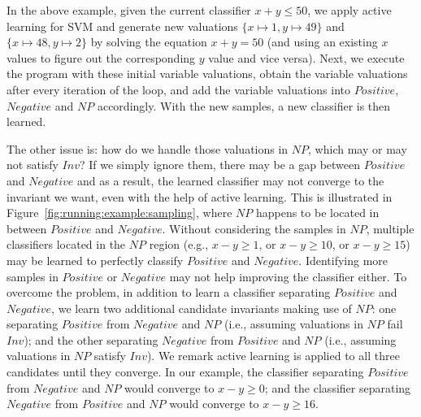 \begin{example}
In the above example, given the current classifier $x+y \leq 50$, we apply active learning for SVM and generate new valuations $\{x \mapsto 1, y \mapsto 49\}$ and $\{x \mapsto 48, y \mapsto 2\}$ by solving the equation $x+y=50$ (and using an existing $x$ values to figure out the corresponding $y$ value and vice versa). Next, we execute the program with these initial variable valuations, obtain the variable valuations after every iteration of the loop, and add the variable valuations into $\mathit{Positive}$, $\mathit{Negative}$ and $\mathit{NP}$ accordingly. With the new samples, a new classifier is then learned.
\end{example}
The other issue is: how do we handle those valuations in $\mathit{NP}$, which may or may not satisfy $\mathit{Inv}$? If we simply ignore them, there may be a gap between $\mathit{Positive}$ and $\mathit{Negative}$ and as a result, the learned classifier may not converge to the invariant we want, even with the help of active learning. This is illustrated in Figure~\ref{fig:running:example:sampling}, where $\mathit{NP}$ happens to be located in between $\mathit{Positive}$ and $\mathit{Negative}$. Without considering the samples in $\mathit{NP}$, multiple classifiers located in the $\mathit{NP}$ region (e.g., $x - y \geq 1$, or $x - y \geq 10$, or $x - y \geq 15$) may be learned to perfectly classify $\mathit{Positive}$ and $\mathit{Negative}$. Identifying more samples in $\mathit{Positive}$ or $\mathit{Negative}$ may not help improving the classifier either. To overcome the problem, in addition to learn a classifier separating $\mathit{Positive}$ and $\mathit{Negative}$, we learn two additional candidate invariants making use of $\mathit{NP}$: one separating $\mathit{Positive}$ from $\mathit{Negative}$ and $\mathit{NP}$ (i.e., assuming valuations in $\mathit{NP}$ fail $\mathit{Inv}$); and the other separating $\mathit{Negative}$ from $\mathit{Positive}$ and $\mathit{NP}$ (i.e., assuming valuations in $\mathit{NP}$ satisfy $\mathit{Inv}$). We remark active learning is applied to all three candidates until they converge. In our example, the classifier separating $\mathit{Positive}$ from $\mathit{Negative}$ and $\mathit{NP}$ would converge to $x - y \geq 0$; and the classifier separating $\mathit{Negative}$ from $\mathit{Positive}$ and $\mathit{NP}$ would converge to $x - y \geq 16$.

